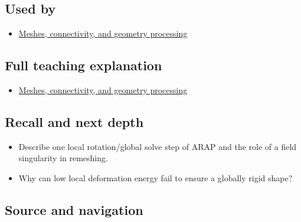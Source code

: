\subsection{Used by}\label{used-by}

\begin{itemize}
\tightlist
\item
  \href{Continuous\%20Notes/University\%20-\%20Worlds,\%20Images\%20and\%20Inference\%20-\%20Graphics,\%20Vision\%20and\%20Photography\#Meshes,\%20connectivity,\%20and\%20geometry\%20processing}{Meshes, connectivity, and geometry processing}
\end{itemize}

\subsection{Full teaching explanation}\label{full-teaching-explanation}

\begin{itemize}
\tightlist
\item
  \href{Continuous\%20Notes/University\%20-\%20Worlds,\%20Images\%20and\%20Inference\%20-\%20Graphics,\%20Vision\%20and\%20Photography\#Meshes,\%20connectivity,\%20and\%20geometry\%20processing}{Meshes, connectivity, and geometry processing}
\end{itemize}

\subsection{Recall and next depth}\label{recall-and-next-depth}

\begin{itemize}
\tightlist
\item
  Describe one local rotation/global solve step of ARAP and the role of a field singularity in remeshing.
\item
  Why can low local deformation energy fail to ensure a globally rigid shape?
\end{itemize}

\subsection{Source and navigation}\label{source-and-navigation}

